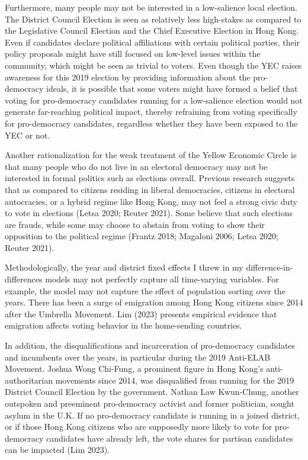 \documentclass[letterpaper, 12pt]{article}
\begin{document}
Furthermore, many people may not be interested in a low-salience local election. The District Council Election is seen as relatively less high-stakes as compared to the Legislative Council Election and the Chief Executive Election in Hong Kong. Even if candidates declare political affiliations with certain political parties, their policy proposals might have still focused on low-level issues within the community, which might be seen as trivial to voters. Even though the YEC raises awareness for this 2019 election by providing information about the pro-democracy ideals, it is possible that some voters might have formed a belief that voting for pro-democracy candidates running for a low-salience election would not generate far-reaching political impact, thereby refraining from voting specifically for pro-democracy candidates, regardless whether they have been exposed to the YEC or not.


Another rationalization for the weak treatment of the Yellow Economic Circle is that many people who do not live in an electoral democracy may not be interested in formal politics such as elections overall. Previous research suggests that as compared to citizens residing in liberal democracies, citizens in electoral autocracies, or a hybrid regime like Hong Kong, may not feel a strong civic duty to vote in elections (Letsa 2020; Reuter 2021). Some believe that such elections are frauds, while some may choose to abstain from voting to show their opposition to the political regime (Frantz 2018; Magaloni 2006; Letsa 2020; Reuter 2021).


Methodologically, the year and district fixed effects I threw in my difference-in-differences models may not perfectly capture all time-varying variables. For example, the model may not capture the effect of population sorting over the years. There has been a surge of emigration among Hong Kong citizens since 2014 after the Umbrella Movement. Lim (2023) presents empirical evidence that emigration affects voting behavior in the home-sending countries. 

In addition, the disqualifications and incarceration of pro-democracy candidates and incumbents over the years, in particular during the 2019 Anti-ELAB Movement. Joshua Wong Chi-Fung, a prominent figure in Hong Kong's anti-authoritarian movements since 2014, was disqualified from running for the 2019 District Council Election by the government. Nathan Law Kwun-Chung, another outspoken and preeminent pro-democracy activist and former politician, sought asylum in the U.K. If no pro-democracy candidate is running in a joined district, or if those Hong Kong citizens who are supposedly more likely to vote for pro-democracy candidates have already left, the vote shares for partisan candidates can be impacted (Lim 2023).
\end{document}
